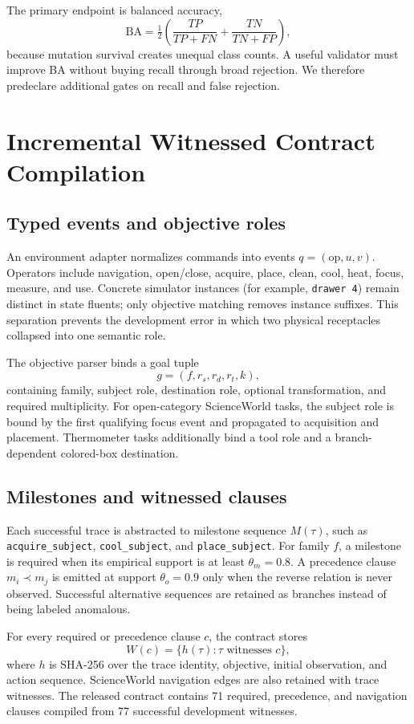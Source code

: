 \documentclass[pdflatex,sn-basic]{sn-jnl}
\newcommand{\ClauseCount}{71}
\newcommand{\TraceCount}{77}
\begin{document}
The primary endpoint is balanced accuracy,
\[
\mathrm{BA}=\tfrac12\left(\frac{TP}{TP+FN}+\frac{TN}{TN+FP}\right),
\]
because mutation survival creates unequal class counts. A useful validator must improve BA without buying recall through broad rejection. We therefore predeclare additional gates on recall and false rejection.

\section{Incremental Witnessed Contract Compilation}
\subsection{Typed events and objective roles}
An environment adapter normalizes commands into events $q=(\mathrm{op},u,v)$. Operators include navigation, open/close, acquire, place, clean, cool, heat, focus, measure, and use. Concrete simulator instances (for example, \texttt{drawer 4}) remain distinct in state fluents; only objective matching removes instance suffixes. This separation prevents the development error in which two physical receptacles collapsed into one semantic role.

The objective parser binds a goal tuple
\[
g=(f,r_s,r_d,r_t,k),
\]
containing family, subject role, destination role, optional transformation, and required multiplicity. For open-category ScienceWorld tasks, the subject role is bound by the first qualifying focus event and propagated to acquisition and placement. Thermometer tasks additionally bind a tool role and a branch-dependent colored-box destination.

\subsection{Milestones and witnessed clauses}
Each successful trace is abstracted to milestone sequence $M(\tau)$, such as \texttt{acquire\_subject}, \texttt{cool\_subject}, and \texttt{place\_subject}. For family $f$, a milestone is required when its empirical support is at least $\theta_m=0.8$. A precedence clause $m_i\prec m_j$ is emitted at support $\theta_o=0.9$ only when the reverse relation is never observed. Successful alternative sequences are retained as branches instead of being labeled anomalous.

For every required or precedence clause $c$, the contract stores
\[
W(c)=\{h(\tau):\tau\text{ witnesses }c\},
\]
where $h$ is SHA-256 over the trace identity, objective, initial observation, and action sequence. ScienceWorld navigation edges are also retained with trace witnesses. The released contract contains \ClauseCount{} required, precedence, and navigation clauses compiled from \TraceCount{} successful development witnesses.
\end{document}
